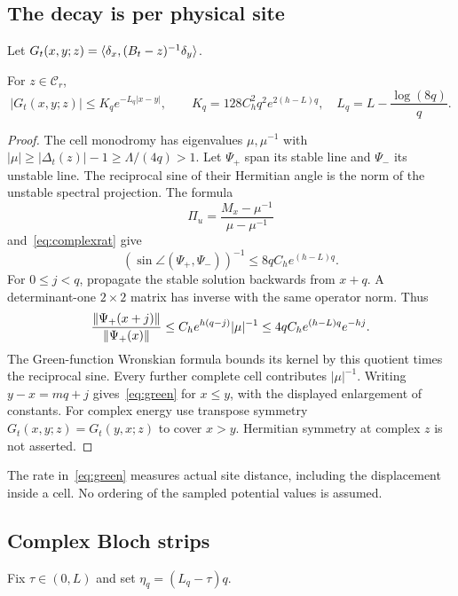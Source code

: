 \subsection{The decay is per physical site}
Let $G_t(x,y;z)=\langle \delta_x,(B_t-z)^{-1}\delta_y\rangle$.

\begin{lemma}\label{lem:green}
For $z\in\mathcal C_r$,
\begin{equation}\label{eq:green}
 |G_t(x,y;z)|\le K_qe^{-L_q|x-y|},\qquad
 K_q=128C_h^2q^2e^{2(h-L)q},\quad
 L_q=L-\frac{\log(8q)}q.
\end{equation}
\end{lemma}
\begin{proof}
The cell monodromy has eigenvalues $\mu,\mu^{-1}$ with
$|\mu|\ge|\Delta_t(z)|-1\ge\Lambda/(4q)>1$. Let $\Psi_+$ span its stable line and $\Psi_-$ its unstable line. The reciprocal sine of their Hermitian angle is the norm of the unstable spectral projection. The formula
\[
 \Pi_u=\frac{M_x-\mu^{-1}}{\mu-\mu^{-1}}
\]
and~\eqref{eq:complexrat} give
\[
 (\sin\angle(\Psi_+,\Psi_-))^{-1}
 \le8qC_he^{(h-L)q}.
\]
For $0\le j<q$, propagate the stable solution backwards from $x+q$. A determinant-one $2\times2$ matrix has inverse with the same operator norm. Thus
\[
 \frac{\lVert \Psi_+(x+j)\rVert}{\lVert \Psi_+(x)\rVert}
 \le C_he^{h(q-j)}|\mu|^{-1}
 \le4qC_he^{(h-L)q}e^{-hj}.
\]
The Green-function Wronskian formula bounds its kernel by this quotient times the reciprocal sine. Every further complete cell contributes $|\mu|^{-1}$. Writing $y-x=mq+j$ gives~\eqref{eq:green} for $x\le y$, with the displayed enlargement of constants. For complex energy use transpose symmetry $G_t(x,y;z)=G_t(y,x;z)$ to cover $x>y$. Hermitian symmetry at complex $z$ is not asserted.
\end{proof}

The rate in~\eqref{eq:green} measures actual site distance, including the displacement inside a cell. No ordering of the sampled potential values is assumed.

\subsection{Complex Bloch strips}
Fix $\tau\in(0,L)$ and set $\eta_q=(L_q-\tau)q$.

